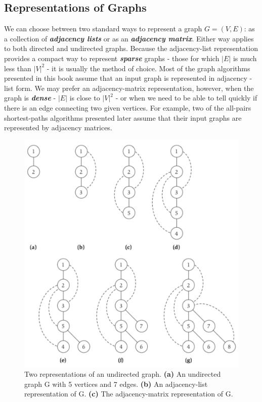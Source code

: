 \documentclass[12pt,a4paper]{book}
\begin{document}
\subsection{Representations of Graphs}
We can choose between two standard ways to represent a graph $G = (V, E)$: as a collection of \textbf{\textit{adjacency lists}} or as an \textbf{\textit{adjacency matrix}}. Either way applies to both directed and undirected graphs. Because the adjacency-list representation provides a compact way to represent \textbf{\textit{sparse}} graphs - those for which $|E|$ is much less than $|V|^{2}$ - it is usually the method of choice. Most of the graph algorithms presented in this book assume that an input graph is represented in adjacency - list form. We may prefer an adjacency-matrix representation, however, when the graph is \textbf{\textit{dense}} - $|E|$ is close to $|V|^{2}$ - or when we need to be able to tell quickly if there is an edge connecting two given vertices. For example, two of the all-pairs shortest-paths algorithms presented later assume that their input graphs are represented by adjacency matrices.\par
\begin{figure}[h]
    \centering
    \label{fig:graphRepresentation1}
    \includegraphics[width=\textwidth]{graphRepresentation1}
    \caption{ Two representations of an undirected graph. \textbf{(a)} An undirected graph G with 5 vertices and 7 edges. \textbf{(b)} An adjacency-list representation of G. \textbf{(c)} The adjacency-matrix representation of G.}
\end{figure}
\end{document}
